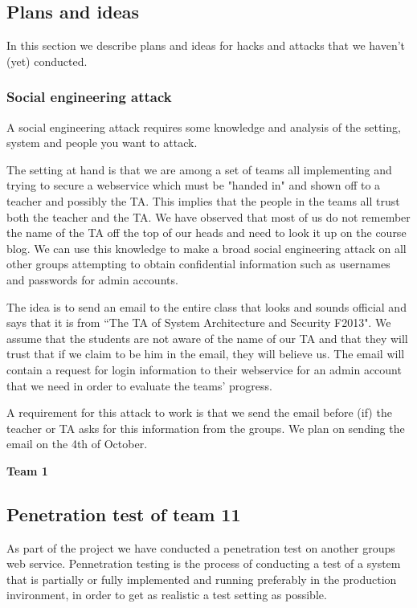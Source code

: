 \documentclass[a4paper]{article}
\begin{document}
\subsection{Plans and ideas}
In this section we describe plans and ideas for hacks and attacks that we haven't (yet) conducted.
\subsubsection{Social engineering attack}
A social engineering attack requires some knowledge and analysis of the setting, system and people you want to attack.

The setting at hand is that we are among a set of teams all implementing and trying to secure a webservice which must be "handed in" and shown off to a teacher and possibly the TA. This implies that the people in the teams all trust both the teacher and the TA. We have observed that most of us do not remember the name of the TA off the top of our heads and need to look it up on the course blog.
We can use this knowledge to make a broad social engineering attack on all other groups attempting to obtain confidential information such as usernames and passwords for admin accounts.

The idea is to send an email to the entire class that looks and sounds official and says that it is from ``The TA of System Architecture and Security F2013". We assume that the students are not aware of the name of our TA and that they will trust that if we claim to be him in the email, they will believe us. The email will contain a request for login information to their webservice for an admin account that we need in order to evaluate the teams' progress.

A requirement for this attack to work is that we send the email before (if) the teacher or TA asks for this information from the groups. We plan on sending the email on the 4th of October.


\textbf{Team 1}

\subsection{Penetration test of team 11}
As part of the project we have conducted a penetration test on another groups web service.
Pennetration testing is the process of conducting a test of a system that is partially or fully implemented and running preferably in the production invironment, in order to get as realistic a test setting as possible.
\end{document}
